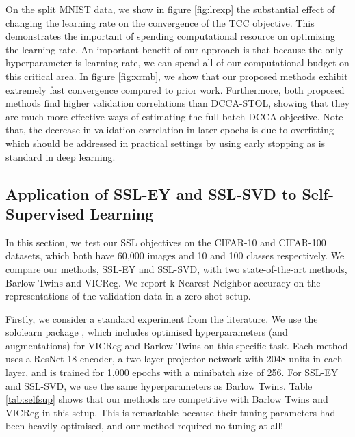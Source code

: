 On the split MNIST data, we show in figure \ref{fig:lrexp} the substantial effect of changing the learning rate on the convergence of the TCC objective. This demonstrates the important of spending computational resource on optimizing the learning rate. An important benefit of our approach is that because the only hyperparameter is learning rate, we can spend all of our computational budget on this critical area. In figure \ref{fig:xrmb}, we show that our proposed methods exhibit extremely fast convergence compared to prior work. Furthermore, both proposed methods find higher validation correlations than DCCA-STOL, showing that they are much more effective ways of estimating the full batch DCCA objective. Note that, the decrease in validation correlation in later epochs is due to overfitting which should be addressed in practical settings by using early stopping as is standard in deep learning.

\subsection{Application of SSL-EY and SSL-SVD to Self-Supervised Learning}

In this section, we test our SSL objectives on the CIFAR-10 and CIFAR-100 datasets, which both have 60,000 images and 10 and 100 classes respectively. We compare our methods, SSL-EY and SSL-SVD, with two state-of-the-art methods, Barlow Twins and VICReg. We report k-Nearest Neighbor accuracy on the representations of the validation data in a zero-shot setup.

Firstly, we consider a standard experiment from the literature.
We use the sololearn package \cite{da2022solo}, which includes optimised hyperparameters (and augmentations) for VICReg and Barlow Twins on this specific task.
Each method uses a ResNet-18 encoder, a two-layer projector network with 2048 units in each layer, and is trained for 1,000 epochs with a minibatch size of 256.
For SSL-EY and SSL-SVD, we use the same hyperparameters as Barlow Twins.  
Table \ref{tab:selfsup} shows that our methods are competitive with Barlow Twins and VICReg in this setup.
This is remarkable because their tuning parameters had been heavily optimised, and our method required no tuning at all!


